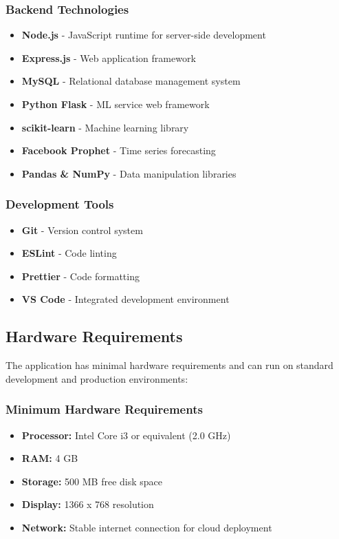 \documentclass[12pt,a4paper]{article}
\begin{document}
\subsubsection{Backend Technologies}
\begin{itemize}
    \item \textbf{Node.js} - JavaScript runtime for server-side development
    \item \textbf{Express.js} - Web application framework
    \item \textbf{MySQL} - Relational database management system
    \item \textbf{Python Flask} - ML service web framework
    \item \textbf{scikit-learn} - Machine learning library
    \item \textbf{Facebook Prophet} - Time series forecasting
    \item \textbf{Pandas \& NumPy} - Data manipulation libraries
\end{itemize}

\subsubsection{Development Tools}
\begin{itemize}
    \item \textbf{Git} - Version control system
    \item \textbf{ESLint} - Code linting
    \item \textbf{Prettier} - Code formatting
    \item \textbf{VS Code} - Integrated development environment
\end{itemize}

\subsection{Hardware Requirements}

The application has minimal hardware requirements and can run on standard development and production environments:

\subsubsection{Minimum Hardware Requirements}
\begin{itemize}
    \item \textbf{Processor:} Intel Core i3 or equivalent (2.0 GHz)
    \item \textbf{RAM:} 4 GB
    \item \textbf{Storage:} 500 MB free disk space
    \item \textbf{Display:} 1366 x 768 resolution
    \item \textbf{Network:} Stable internet connection for cloud deployment
\end{itemize}
\end{document}
